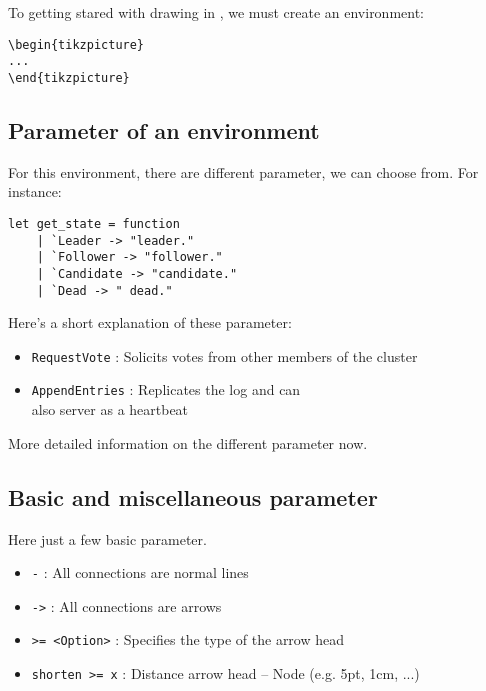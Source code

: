 \documentclass[../../../include/open-logic-chapter]{subfiles}
\begin{document}
		To getting stared with drawing in , we must create an environment:\\

			\begin{lstlisting}[caption={Create a simple enviroment.}]
\begin{tikzpicture}
...
\end{tikzpicture}
			\end{lstlisting}

	\subsection{Parameter of an environment}
		For this environment, there are different parameter, we can choose from. For instance:\\

			\begin{lstlisting}[style=ocamlstyle,caption={A example with parameter in a environment.}]
  let get_state = function
    | `Leader -> "leader."
    | `Follower -> "follower."
    | `Candidate -> "candidate."
    | `Dead -> " dead."
			\end{lstlisting}


		Here's a short explanation of these parameter:\\
		\begin{itemize}
			\item \texttt{RequestVote} : Solicits votes from other members of the cluster
			\item \texttt{AppendEntries} : Replicates the log and can\\
also server as a heartbeat
		\end{itemize}
		More detailed information on the different parameter now.
	\subsection{Basic and miscellaneous parameter}
		Here just a few basic parameter.
		\begin{itemize}
			\item \texttt{-} : All connections are normal lines
			\item \texttt{->} : All connections are arrows
			\item \texttt{>= <Option>} : Specifies the type of the arrow head
			\item \texttt{shorten >= x} : Distance arrow head -- Node (e.g. 5pt, 1cm, ...)
		\end{itemize}
\end{document}
